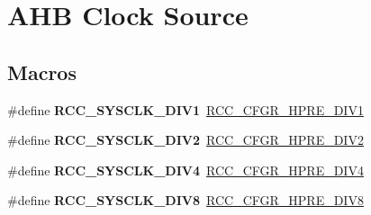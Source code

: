 \hypertarget{group___r_c_c___a_h_b___clock___source}{}\section{A\+HB Clock Source}
\label{group___r_c_c___a_h_b___clock___source}
\subsection*{Macros}
\begin{DoxyCompactItemize}
\item 
\mbox{\label{group___r_c_c___a_h_b___clock___source_ga226f5bf675015ea677868132b6b83494}} 
\#define {\bfseries R\+C\+C\+\_\+\+S\+Y\+S\+C\+L\+K\+\_\+\+D\+I\+V1}~\hyperlink{group___peripheral___registers___bits___definition_ga2b7d7f29b09a49c31404fc0d44645c84}{R\+C\+C\+\_\+\+C\+F\+G\+R\+\_\+\+H\+P\+R\+E\+\_\+\+D\+I\+V1}
\item 
\mbox{\label{group___r_c_c___a_h_b___clock___source_gac37c0610458a92e3cb32ec81014625c3}} 
\#define {\bfseries R\+C\+C\+\_\+\+S\+Y\+S\+C\+L\+K\+\_\+\+D\+I\+V2}~\hyperlink{group___peripheral___registers___bits___definition_gaa9eeb5e38e53e79b08a4ac438497ebea}{R\+C\+C\+\_\+\+C\+F\+G\+R\+\_\+\+H\+P\+R\+E\+\_\+\+D\+I\+V2}
\item 
\mbox{\label{group___r_c_c___a_h_b___clock___source_ga6fd3652d6853563cdf388a4386b9d22f}} 
\#define {\bfseries R\+C\+C\+\_\+\+S\+Y\+S\+C\+L\+K\+\_\+\+D\+I\+V4}~\hyperlink{group___peripheral___registers___bits___definition_gaffe860867ae4b1b6d28473ded1546d91}{R\+C\+C\+\_\+\+C\+F\+G\+R\+\_\+\+H\+P\+R\+E\+\_\+\+D\+I\+V4}
\item 
\mbox{\label{group___r_c_c___a_h_b___clock___source_ga7def31373854ba9c72bb76b1d13e3aad}} 
\#define {\bfseries R\+C\+C\+\_\+\+S\+Y\+S\+C\+L\+K\+\_\+\+D\+I\+V8}~\hyperlink{group___peripheral___registers___bits___definition_gaca71d6b42bdb83b5ff5320578869a058}{R\+C\+C\+\_\+\+C\+F\+G\+R\+\_\+\+H\+P\+R\+E\+\_\+\+D\+I\+V8}
\item 
\mbox{\label{group___r_c_c___a_h_b___clock___source_ga895462b261e03eade3d0139cc1327a51}} 

\end{DoxyCompactItemize}
